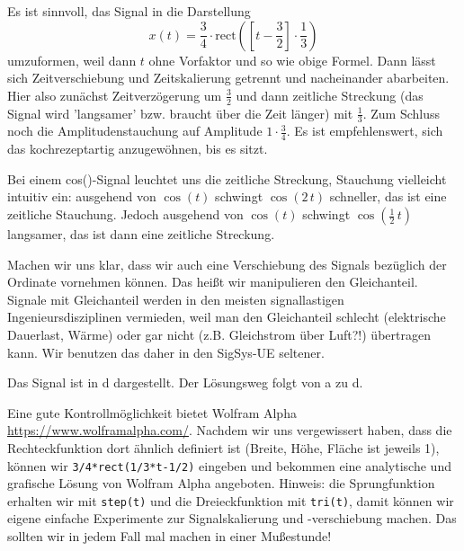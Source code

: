 \begin{Ansatz}
Es ist sinnvoll, das Signal in die Darstellung
\begin{equation}
x(t) = \frac{3}{4} \cdot \mathrm{rect}(\left[t-\frac{3}{2}\right]\cdot \frac{1}{3})
\end{equation}
umzuformen, weil dann $t$ ohne Vorfaktor und so wie obige Formel.
Dann lässt sich Zeitverschiebung und Zeitskalierung
getrennt und nacheinander abarbeiten. Hier also zunächst Zeitverzögerung um
$\frac{3}{2}$ und dann zeitliche Streckung (das Signal wird 'langsamer' bzw.
braucht über die Zeit länger) mit $\frac{1}{3}$.
%
Zum Schluss noch die Amplitudenstauchung auf Amplitude $1 \cdot \frac{3}{4}$.
%
Es ist empfehlenswert, sich das kochrezeptartig anzugewöhnen, bis es sitzt.

Bei einem cos()-Signal leuchtet uns die zeitliche Streckung, Stauchung vielleicht
intuitiv ein: ausgehend von $\cos(t)$ schwingt $\cos(2\,t)$ schneller, das ist eine
zeitliche Stauchung.
%
Jedoch ausgehend von $\cos(t)$ schwingt $\cos(\frac{1}{2}\,t)$
langsamer, das ist dann eine zeitliche Streckung.

Machen wir uns klar, dass wir auch eine Verschiebung des Signals bezüglich der
Ordinate vornehmen können. Das heißt wir manipulieren den Gleichanteil.
%
Signale mit Gleichanteil werden in den meisten signallastigen
Ingenieursdisziplinen vermieden, weil man den Gleichanteil schlecht
(elektrische Dauerlast, Wärme) oder gar nicht (z.B. Gleichstrom über Luft?!)
übertragen kann.
%
Wir benutzen das daher in den SigSys-UE seltener.

\end{Ansatz}
\begin{Loesung}
Das Signal ist in d dargestellt. Der Lösungsweg folgt von
a zu d.

Eine gute Kontrollmöglichkeit bietet Wolfram Alpha
\url{https://www.wolframalpha.com/}.
Nachdem wir uns vergewissert haben, dass die Rechteckfunktion dort ähnlich definiert
ist (Breite, Höhe, Fläche ist jeweils 1), können wir
\verb|3/4*rect(1/3*t-1/2)| eingeben und bekommen eine analytische und grafische
Lösung von Wolfram Alpha angeboten.
Hinweis: die Sprungfunktion erhalten wir mit \verb|step(t)|
und die Dreieckfunktion mit \verb|tri(t)|, damit können wir eigene einfache
Experimente zur Signalskalierung und -verschiebung machen.
%
Das sollten wir in jedem Fall mal machen in einer Mußestunde!

\end{Loesung}

